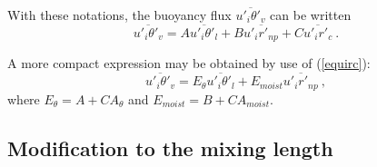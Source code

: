 With these notations, the buoyancy flux
$\overline{{u'_{i}}{{\theta}'_{v}}}$ can be written
\begin{equation}\label{eqn:u'itheta'v}
\overline{{u'_{i}}{{\theta}'_{v}}} = A \overline{{u'_{i}}{{\theta}'_{l}}} +
B \overline{{u'_{i}}{r'_{np}}} + C \overline{{u'_{i}}{r'_{c}}}~.
\end{equation}

A more compact expression may be obtained by use of (\ref{equirc}):
\begin{equation} \label{ErEtheta}
\overline{{u'_{i}}{{\theta}'_{v}}} = E_{\theta} \overline{{u'_{i}}{{\theta}'_{l}}} +
E_{moist} \overline{{u'_{i}}{r'_{np}}}~,
\end{equation}
where $E_{\theta} = A + C A_{\theta}$ and $E_{moist} = B + C A_{moist}$.


\subsection{Modification to the mixing length}



